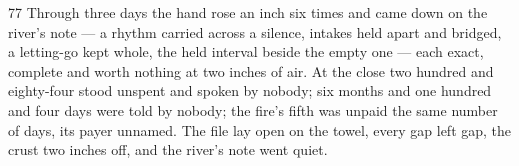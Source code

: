 \begin{CRchronicle}{77}
Through three days the hand rose an inch six times and came down on the river’s note --- a rhythm carried across a silence, intakes held apart and bridged, a letting-go kept whole, the held interval beside the empty one --- each exact, complete and worth nothing at two inches of air. At the close two hundred and eighty-four stood unspent and spoken by nobody; six months and one hundred and four days were told by nobody; the fire’s fifth was unpaid the same number of days, its payer unnamed. The file lay open on the towel, every gap left gap, the crust two inches off, and the river’s note went quiet.
\end{CRchronicle}

